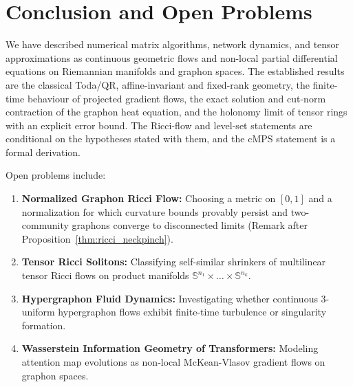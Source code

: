 \documentclass[11pt,a4paper,reqno]{amsart}
\theoremstyle{definition}
\numberwithin{equation}{section}
\providecommand{\Sph}{\mathbb{S}}
\providecommand{\Sph}{\mathbb{S}}
\begin{document}
\section{Conclusion and Open Problems}
\label{sec:conclusion}

We have described numerical matrix algorithms, network dynamics, and tensor approximations as continuous geometric flows and non-local partial differential equations on Riemannian manifolds and graphon spaces. The established results are the classical Toda/QR, affine-invariant and fixed-rank geometry, the finite-time behaviour of projected gradient flows, the exact solution and cut-norm contraction of the graphon heat equation, and the holonomy limit of tensor rings with an explicit error bound. The Ricci-flow and level-set statements are conditional on the hypotheses stated with them, and the cMPS statement is a formal derivation.

Open problems include:
\begin{enumerate}
    \item \textbf{Normalized Graphon Ricci Flow:} Choosing a metric on $[0,1]$ and a normalization for which curvature bounds provably persist and two-community graphons converge to disconnected limits (Remark after Proposition~\ref{thm:ricci_neckpinch}).
    \item \textbf{Tensor Ricci Solitons:} Classifying self-similar shrinkers of multilinear tensor Ricci flows on product manifolds $\Sph^{n_1} \times \dots \times \Sph^{n_k}$.
    \item \textbf{Hypergraphon Fluid Dynamics:} Investigating whether continuous 3-uniform hypergraphon flows exhibit finite-time turbulence or singularity formation.
    \item \textbf{Wasserstein Information Geometry of Transformers:} Modeling attention map evolutions as non-local McKean-Vlasov gradient flows on graphon spaces.
\end{enumerate}


\end{document}
